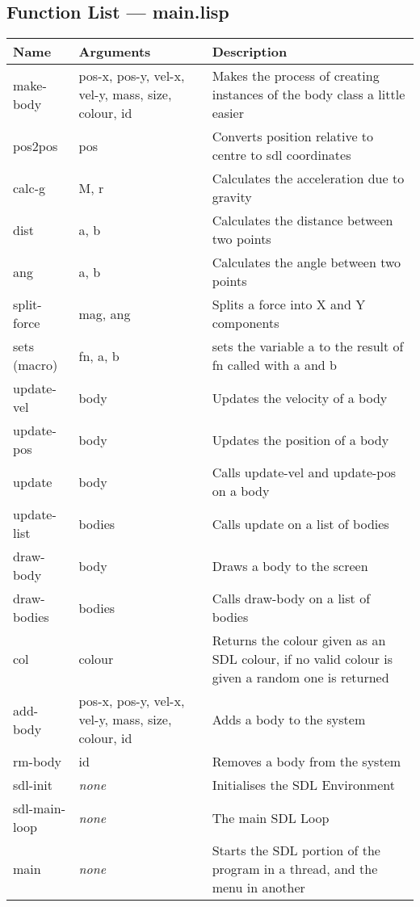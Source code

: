 \subsection{Function List --- main.lisp}
\begin{tabular}{p{}p{}p{}}
	Name & Arguments & Description\\ \hline
	make-body & pos-x, pos-y, vel-x, vel-y, mass, size, colour, id &
		Makes the process of creating instances of the body class a
		little easier\\
	pos2pos & pos & Converts position relative to centre to sdl coordinates
	\\
	calc-g & M, r & Calculates the acceleration due to gravity \\
	dist & a, b & Calculates the distance between two points \\
	ang & a, b & Calculates the angle between two points \\
	split-force & mag, ang & Splits a force into X and Y components \\
	sets (macro) & fn, a, b & sets the variable a to the result of fn called
	with a and b \\
	update-vel & body & Updates the velocity of a body \\
	update-pos & body & Updates the position of a body \\
	update & body & Calls update-vel and update-pos on a body \\
	update-list & bodies & Calls update on a list of bodies \\
	draw-body & body & Draws a body to the screen \\
	draw-bodies & bodies & Calls draw-body on a list of bodies \\
	col & colour & Returns the colour given as an SDL colour, if no valid
	colour is given a random one is returned \\
	add-body & pos-x, pos-y, vel-x, vel-y, mass, size, colour, id & Adds a
	body to the system \\
	rm-body & id & Removes a body from the system \\
	sdl-init & \emph{none} & Initialises the SDL Environment \\
	sdl-main-loop & \emph{none} & The main SDL Loop \\
	main & \emph{none} & Starts the SDL portion of the program in a thread,
	and the menu in another
\end{tabular}

